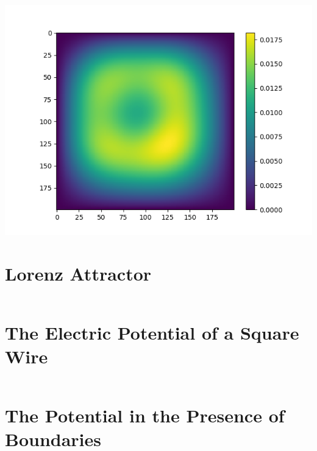 \documentclass[10pt]{amsart}
\begin{document}
\centering
\includegraphics[width=0.8\linewidth]{../P3_3.png}


\appendix
\newpage
\section{Lorenz Attractor}%
\label{sec:lorenz_attractor}

\inputminted[linenos]{python}{../P1.py}

\newpage
\section{The Electric Potential of a Square Wire}%
\label{sec:the_electric_potential_of_a_square_wire}

\inputminted[linenos]{python}{../P2.py}

\newpage
\section{The Potential in the Presence of Boundaries}%
\label{sec:the_potential_in_the_presence_of_boundaries}

\inputminted[linenos]{python}{../P3.py}
\end{document}
